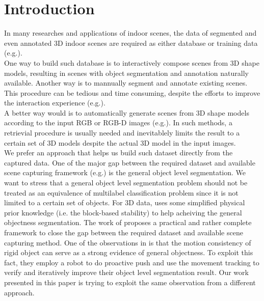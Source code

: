 \section{Introduction}
\label{sec:intro}
In many researches and applications of indoor scenes, the data of segmented and even annotated 3D indoor scenes are required as either database or training data (e.g.\cite{SearchClassify}\cite{SceneFromExample}\cite{Fisher:2012:ESO:2366145.2366154}\cite{Chen:2014:ASM:2661229.2661239}\cite{Fisher:ActivityCentricSceneSynthesis}).\\
One way to build such database is to interactively compose scenes from 3D shape models, resulting in scenes with object segmentation and annotation naturally available. Another way is to mannually segment and annotate existing scenes. This procedure can be tedious and time consuming, despite the efforts to improve the interaction experience (e.g.\cite{Merrell:2011:IFL:2010324.1964982}\cite{Xu:2013:SSC:2461912.2461968}).\\
A better way would is to automatically generate scenes from 3D shape models according to the input RGB or RGB-D images (e.g.\cite{Liu2015Model}\cite{Chen:2014:ASM:2661229.2661239}). In such methods, a retrievial procedure is usually needed and inevitablely limits the result to a certain set of 3D models despite the actual 3D model in the input images.\\
We prefer an approach that helps us build such dataset directly from the captured data. One of the major gap between the required dataset and available scene capturing framework (e.g.\cite{KinectFusion}) is the general object level segmentation. We want to stress that a general object level segmentation problem should not be treated as an equivalence of multilabel classification problem since it is not limited to a certain set of objects. For 3D data, \cite{3DReasoningfromBlockstoStability} uses some simplified physical prior knowledge (i.e. the block-based stability) to help acheiving the general objectness segmentation. The work of \cite{Xu:2015:ACS:2816795.2818075} proposes a practical and rather complete framework to close the gap between the required dataset and available scene capturing method. One of the observations in \cite{Xu:2015:ACS:2816795.2818075} is that the motion consistency of rigid object can serve as a strong evidence of general objectness. To exploit this fact, they employ a robot to do proactive push and use the movement tracking to verify and iteratively improve their object level segmentation result. Our work presented in this paper is trying to exploit the same observation from a different approach.\\
